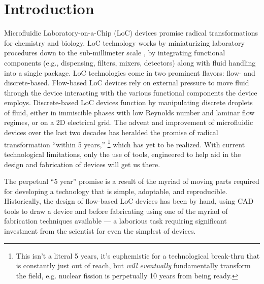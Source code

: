 \section{Introduction}
\label{sec:introduction}
Microfluidic Laboratory-on-a-Chip (LoC) devices promise radical transformations for chemistry and biology.
LoC technology works by miniaturizing laboratory procedures down to the sub-millimeter scale \cite{thorsen02}, by integrating functional components (e.g., dispensing, filters, mixers, detectors) along with fluid handling into a single package.
LoC technologies come in two prominent flavors: flow- and %
discrete-based.
Flow-based LoC devices rely on external pressure to move fluid through the device interacting with the various functional components the device employs.
Discrete-based LoC devices function by manipulating discrete droplets of fluid, either in immiscible phases with low Reynolds number and laminar flow regimes, or on a 2D electrical grid. %
The advent and improvement of microfluidic devices over the last two decades has heralded the promise of radical transformation ``within 5 years,'' \footnote{This isn't a literal 5 years, it's euphemistic for a technological break-thru that is constantly just out of reach, but \textit{will eventually} fundamentally transform the field, e.g. nuclear fission is perpetually 10 years from being ready.} which has yet to be realized.
With current technological limitations, only the use of tools, engineered to help aid in the design and fabrication of devices will get us there.

The perpetual ``5 year'' promise is a result of the myriad of moving parts required for developing a technology that is simple, adoptable, and reproducible.
Historically, the design of flow-based LoC devices has been by hand, using CAD tools to draw a device and before fabricating using one of the myriad of fabrication techniques available --- %
a laborious task requiring significant investment from the scientist for even the simplest of devices.

